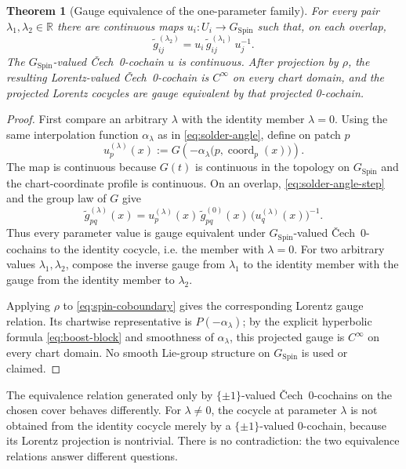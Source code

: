 \documentclass[11pt,a4paper]{article}
\newtheorem{theorem}{Theorem}[section]
\theoremstyle{definition}
\theoremstyle{remark}
\newcommand{\R}{\mathbb{R}}
\newcommand{\SpinG}{G_{\mathrm{Spin}}}
\newcommand{\Cech}{\ifmmode\text{\v{C}ech}\else\v{C}ech\fi}
\begin{document}
\begin{theorem}[Gauge equivalence of the one-parameter family]
\label{thm:gauge-orbit}
For every pair \(\lambda_{1},\lambda_{2}\in\R\) there are continuous maps \(u_i:U_i\to\SpinG\) such that, on each overlap,
\[
   \widetilde g_{ij}^{(\lambda_2)}
   =u_i\,\widetilde g_{ij}^{(\lambda_1)}\,u_j^{-1}.
\tag{11.7}
\]
The \(\SpinG\)-valued \Cech\ 0-cochain \(u\) is continuous.  After projection by \(\rho\), the resulting
Lorentz-valued \Cech\ 0-cochain is \(C^\infty\) on every chart domain, and the
projected Lorentz cocycles are gauge equivalent by that projected 0-cochain.
\end{theorem}

\begin{proof}
First compare an arbitrary \(\lambda\) with the identity member \(\lambda=0\).  Using the
same interpolation function \(\alpha_\lambda\) as in
\eqref{eq:solder-angle}, define on patch \(p\)
\[
   u_p^{(\lambda)}(x)
   :=G\!\left(-\alpha_\lambda
       \bigl(p,\operatorname{coord}_p(x)\bigr)\right).
\tag{11.7a}\label{eq:spin-gauge}
\]
The map is continuous because \(G(t)\) is continuous in the topology on \(\SpinG\) and the chart-coordinate profile is continuous.  On an overlap,
\eqref{eq:solder-angle-step} and the group law of \(G\) give
\[
   \widetilde g_{pq}^{(\lambda)}(x)
   =u_p^{(\lambda)}(x)\,
      \widetilde g_{pq}^{(0)}(x)\,
      \bigl(u_q^{(\lambda)}(x)\bigr)^{-1}.
\tag{11.7b}\label{eq:spin-coboundary}
\]
Thus every parameter value is gauge equivalent under \(\SpinG\)-valued \Cech\ 0-cochains to the identity cocycle, i.e. the member with \(\lambda=0\).
For two arbitrary values \(\lambda_1,\lambda_2\), compose the inverse gauge
from \(\lambda_1\) to the identity member with the gauge from the identity member to \(\lambda_2\).

Applying \(\rho\) to \eqref{eq:spin-coboundary} gives the corresponding
Lorentz gauge relation.  Its chartwise representative is
\(P(-\alpha_\lambda)\); by the explicit hyperbolic formula
\eqref{eq:boost-block} and smoothness of \(\alpha_\lambda\), this projected
gauge is \(C^\infty\) on every chart domain.  No smooth Lie-group structure on \(\SpinG\) is used or claimed.
\end{proof}

The equivalence relation generated only by \(\{\pm1\}\)-valued \Cech\ 0-cochains on the chosen cover behaves differently.
For \(\lambda\neq0\), the cocycle at parameter \(\lambda\) is not obtained from the identity cocycle merely by a \(\{\pm1\}\)-valued
0-cochain, because its Lorentz projection is nontrivial.  There is no contradiction: the two equivalence relations answer
different questions.
\end{document}
